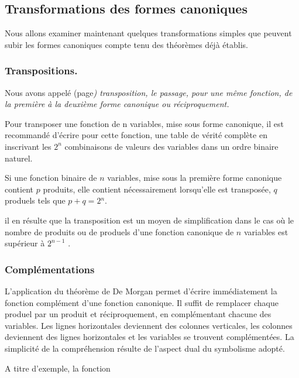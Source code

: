 \subsection{Transformations des formes canoniques}

Nous allons examiner maintenant quelques transformations simples que
peuvent subir les formes canoniques compte tenu des théorèmes déjà
établis.

\subsubsection{Transpositions.}

\textendash{} Nous avons appelé (page\pageref{transposition}\emph{)
transposition, le passage, pour une même fonction, de la première
à la deuxième forme canonique ou réciproquement.}

Pour transposer une fonction de \og n \fg{} variables, mise sous
forme canonique, il est recommandé d'écrire pour cette fonction, une
table de vérité complète en inscrivant les \og $2^{n}$ \fg{} combinaisons
de valeurs des variables dans un ordre binaire naturel.

Si une fonction binaire de \og $n$ \fg{} variables, mise sous la
première forme canonique contient \og $p$ \fg{} produits, elle
contient nécessairement lorsqu'elle est transposée, \og $q$ \fg{}
produels tels que $p+q=2$$^{n}$.

il en résulte que la transposition est un moyen de simplification
dans le cas où le nombre de produits ou de produels d'une fonction
canonique de \og $n$ \fg{} variables est supérieur à \og $2^{n-1}$ \fg{}.

\subsubsection{Complémentations }

\textendash{} L'application du théorème de De Morgan permet d'écrire
immédiatement la fonction complément d'une fonction canonique. Il
suffit de remplacer chaque produel par un produit et réciproquement,
en complémentant chacune des variables. Les lignes horizontales deviennent
des colonnes verticales, les colonnes deviennent des lignes horizontales
et les variables se trouvent complémentées. La simplicité de la compréhension
résulte de l'aspect dual du symbolisme adopté. 

A titre d'exemple, la fonction 

\medskip

